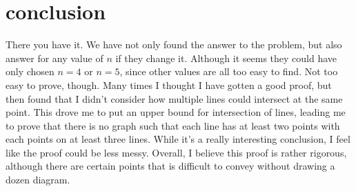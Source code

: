 \documentclass[a4paper, 12pt]{article}
\begin{document}
\clearpage
\section{conclusion}
There you have it. We have not only found the answer to the problem, but also answer for any value of $n$ if they change it. Although it seems they could have only chosen $n=4$ or $n=5$, since other values are all too easy to find. Not too easy to prove, though. Many times I thought I have gotten a good proof, but then found that I didn't consider how multiple lines could intersect at the same point. This drove me to put an upper bound for intersection of lines, leading me to prove that there is no graph such that each line has at least two points with each points on at least three lines. While it's a really interesting conclusion, I feel like the proof could be less messy. 
Overall, I believe this proof is rather rigorous, although there are certain points that is difficult to convey without drawing a dozen diagram.

\end{document}
